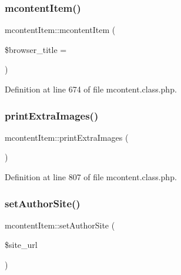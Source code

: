 \mbox{\label{classmcontentItem_a9cf9b439a6c29b1354b298ab6023ea3e}} 
\subsubsection{\texorpdfstring{mcontent\+Item()}{mcontentItem()}}
{\footnotesize\ttfamily mcontent\+Item\+::mcontent\+Item (\begin{DoxyParamCaption}\item[{}]{\$browser\+\_\+title = {\ttfamily \textquotesingle{}\textquotesingle{}} }\end{DoxyParamCaption})}



Definition at line 674 of file mcontent.\+class.\+php.

\mbox{\label{classmcontentItem_a0cd7ac4bbaf7e7561f5597920c691f9d}} 
\subsubsection{\texorpdfstring{print\+Extra\+Images()}{printExtraImages()}}
{\footnotesize\ttfamily mcontent\+Item\+::print\+Extra\+Images (\begin{DoxyParamCaption}{ }\end{DoxyParamCaption})}



Definition at line 807 of file mcontent.\+class.\+php.

\mbox{\label{classmcontentItem_adaa9ad60dd8f5373b9f2258a6effe70c}} 
\subsubsection{\texorpdfstring{set\+Author\+Site()}{setAuthorSite()}}
{\footnotesize\ttfamily mcontent\+Item\+::set\+Author\+Site (\begin{DoxyParamCaption}\item[{}]{\$site\+\_\+url }\end{DoxyParamCaption})}



